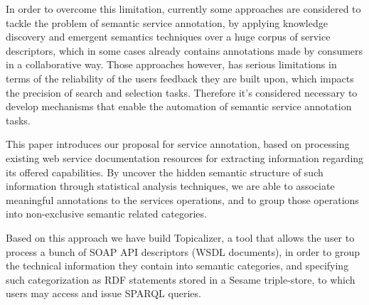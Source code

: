In order to overcome this limitation, currently some approaches are considered to tackle the problem of semantic service annotation, by applying knowledge discovery and emergent semantics techniques over a huge corpus of service descriptors, which in some cases already contains annotations made by consumers in a collaborative way. Those approaches however, has serious limitations in terms of the reliability of the users feedback they are built upon, which impacts the precision of search and selection tasks. Therefore it’s considered necessary to develop mechanisms that enable the automation of semantic service annotation tasks.

This paper introduces our proposal for service annotation, based on processing existing web service documentation resources for extracting information regarding its offered capabilities. By uncover the hidden semantic structure of such information through statistical analysis techniques, we are able to associate meaningful annotations to the services operations, and to group those operations into non-exclusive semantic related categories.

Based on this approach we have build Topicalizer, a tool that allows the user to process a bunch of SOAP API descriptors (WSDL documents), in order to group the technical information they contain into semantic categories, and specifying such categorization as RDF statements stored in a Sesame triple-store, to which users may access and issue SPARQL queries.